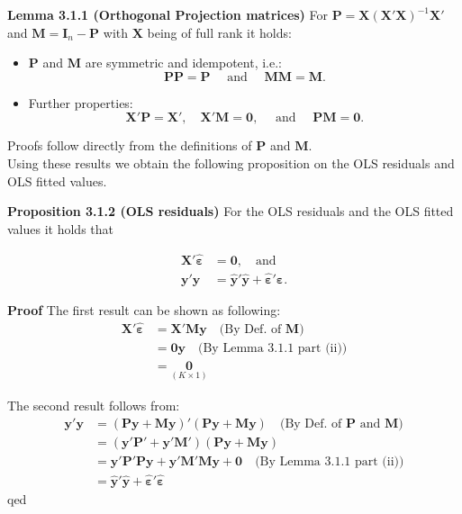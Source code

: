 \documentclass[
]{book}
\begin{document}
\textbf{Lemma 3.1.1 (Orthogonal Projection matrices)}
For \(\mathbf{P}=\mathbf{X}(\mathbf{X}'\mathbf{X})^{-1}\mathbf{X}'\) and
\(\mathbf{M}=\mathbf{I}_n-\mathbf{P}\) with \(\mathbf{X}\) being of full
rank it holds:

\begin{itemize}
\item
  \(\mathbf{P}\) and \(\mathbf{M}\) are symmetric and idempotent, i.e.:
  \[\mathbf{P}\mathbf{P}=\mathbf{P}\quad\text{ and }\quad \mathbf{M}\mathbf{M}=\mathbf{M}.\]
\item
  Further properties:
  \[\mathbf{X}'\mathbf{P}=\mathbf{X}',\quad \mathbf{X}'\mathbf{M}=\mathbf{0},\quad\text{ and }\quad \mathbf{P}\mathbf{M}=\mathbf{0}.\]
\end{itemize}

Proofs follow directly from the definitions of \(\mathbf{P}\) and
\(\mathbf{M}\).\\
Using these results we obtain the following proposition on the OLS
residuals and OLS fitted values.

\textbf{Proposition 3.1.2 (OLS residuals)}
For the OLS residuals and the OLS fitted values it holds that

\begin{align*}
    \mathbf{X}'\hat{\boldsymbol{\varepsilon}} &= \mathbf{0}, \quad\text{and}\\
    \mathbf{y}'\mathbf{y} &= \hat{\mathbf{y}}'\hat{\mathbf{y}}+\hat{\boldsymbol{\varepsilon}}'\hat{\boldsymbol{\varepsilon}}.
\end{align*}

\textbf{Proof}
The first result can be shown as following:
\begin{align*}
  \mathbf{X}'\hat{\boldsymbol{\varepsilon}}
   &= \mathbf{X}'\mathbf{M}\mathbf{y}\quad\text{(By Def. of $\mathbf{M}$)}\\
   &= \mathbf{0}\mathbf{y}\quad\text{(By Lemma 3.1.1 part (ii))}\\
   &= \underset{(K\times 1)}{\mathbf{0}}
\end{align*}

The second result follows from:
\begin{align*}
  \mathbf{y}'\mathbf{y} &= (\mathbf{P}\mathbf{y}+\mathbf{M}\mathbf{y})'(\mathbf{P}\mathbf{y}+\mathbf{M}\mathbf{y})\quad\text{(By Def.~of $\mathbf{P}$ and $\mathbf{M}$)}\\
   &= (\mathbf{y}'\mathbf{P}'+\mathbf{y}'\mathbf{M}')(\mathbf{P}\mathbf{y}+\mathbf{M}\mathbf{y})\\
   &= \mathbf{y}'\mathbf{P}'\mathbf{P}\mathbf{y}+\mathbf{y}'\mathbf{M}'\mathbf{M}\mathbf{y}+\mathbf{0}\quad\text{(By Lemma 3.1.1 part (ii))}\\
   &= \hat{\mathbf{y}}'\hat{\mathbf{y}}+\hat{\boldsymbol{\varepsilon}}'\hat{\boldsymbol{\varepsilon}}
\end{align*}
qed
\end{document}
